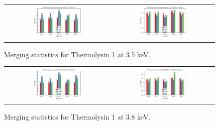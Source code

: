 \begin{figure}
    \centering
    \begin{tabular}{cc}
    \includegraphics[width = 0.5\textwidth]{plots/exp1/tlys_9_P6122/3p5_I_over_sigma.png} & \includegraphics[width = 0.5\textwidth]{plots/exp1/tlys_9_P6122/3p5_rmerges.png}
    \end{tabular}
    \caption{Merging statistics for Thermolysin 1 at 3.5 keV.}
    \label{fig:tlys_9_3p5}
\end{figure}

\begin{figure}[h]
    \centering
    \begin{tabular}{cc}
    \includegraphics[width = 0.5\textwidth]{plots/exp1/tlys_9_P6122/3p8_I_over_sigma.png} & \includegraphics[width = 0.5\textwidth]{plots/exp1/tlys_9_P6122/3p8_rmerges.png}
    \end{tabular}
    \caption{Merging statistics for Thermolysin 1 at 3.8 keV.}
    \label{fig:tlys_9_3p8}
\end{figure}

